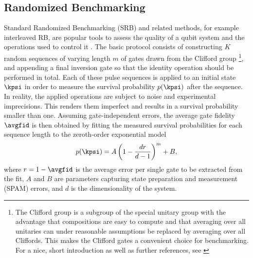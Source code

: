 \subsection{Randomized Benchmarking}\label{sec:examples:randomized_benchmarking}
Standard Randomized Benchmarking (SRB) and related methods, for example interleaved RB, are popular tools to assess the quality of a qubit system and the operations used to control it \cite{Knill2008,Magesan2011,Magesan2012}. The basic protocol consists of constructing $K$ random sequences of varying length $m$ of gates drawn from the Clifford group
\footnote{The Clifford group is a subgroup of the special unitary group with the advantage that compositions are easy to compute and that averaging over all unitaries can under reasonable assumptions be replaced by averaging over all Cliffords. This makes the Clifford gates a convenient choice for benchmarking. For a nice, short introduction as well as further references, see \cite{Ozols2008}},
and appending a final inversion gate so that the identity operation should be performed in total. Each of these pulse sequences is applied to an initial state $\kpsi$ in order to measure the survival probability $p(\kpsi)$ after the sequence. In reality, the applied operations are subject to noise and experimental imprecisions. This renders them imperfect and results in a survival probability smaller than one. Assuming gate-independent errors, the average gate fidelity $\avgfid$ is then obtained by fitting the measured survival probabilities for each sequence length to the zeroth-order exponential model \cite{Magesan2011}
\begin{equation}\label{eq:SRB}
    p(\kpsi) = A \left(1 - \frac{dr}{d-1}\right)^m + B,
\end{equation}
where $r = 1 - \avgfid$ is the average error per single gate to be extracted from the fit, $A$ and $B$ are parameters capturing state preparation and measurement (SPAM) errors, and $d$ is the dimensionality of the system.

